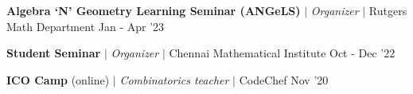 \resumeProjectHeading
{\textbf{Algebra `N' Geometry Learning Seminar (ANGeLS)} $|$ \textit{Organizer} $|$ Rutgers Math Department}
{Jan - Apr '23}
{}
\vspace{\mygap}

\resumeProjectHeading
{\textbf{Student Seminar} $|$ \textit{Organizer} $|$ Chennai Mathematical Institute}
{Oct - Dec '22}
{}
\vspace{\mygap}

\resumeProjectHeading
{\textbf{ICO Camp}  (online) $|$ \textit{Combinatorics teacher} $|$ CodeChef}
{Nov '20}
{}


\resumeSubHeadingListEnd











